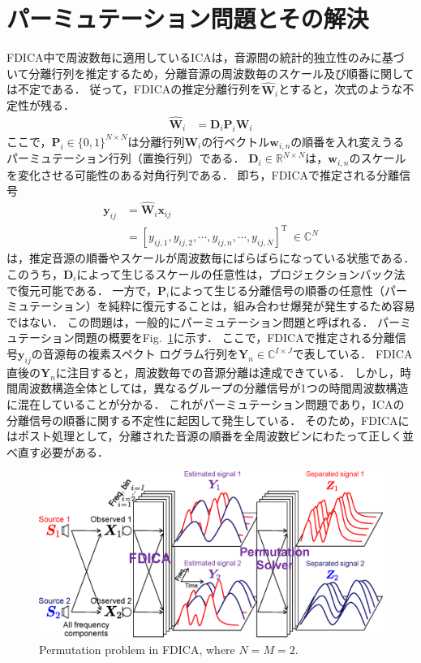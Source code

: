 \section{パーミュテーション問題とその解決}
\label{sec:pp}
FDICA中で周波数毎に適用しているICAは，音源間の統計的独立性のみに基づいて分離行列を推定するため，分離音源の周波数毎のスケール及び順番に関しては不定である．
従って，FDICAの推定分離行列を$\hat{\bm{W}}_i$とすると，次式のような不定性が残る．
\begin{align}
	\hat{\bm{W}}_{i} &= \bm{D}_{i}\bm{P}_{i}  \bm{W}_{i}
\end{align}
ここで，$\bm{P}_i \in \{0, 1\}^{N \times N}$は分離行列$\bm{W}_{i}$の行ベクトル$\bm{w}_{i, n}$の順番を入れ変えうるパーミュテーション行列（置換行列）である．
$\bm{D}_i \in \mathbb{R}^{N \times N}$は，$\bm{w}_{i,n}$のスケールを変化させる可能性のある対角行列である．
即ち，FDICAで推定される分離信号
\begin{align}
\bm{y}_{ij} &= \hat{\bm{W}}_i\bm{x}_{ij} \\
&=\left[ y_{ij,1},y_{ij,2}, \cdots, y_{ij,n}, \cdots, y_{ij,N} \right]^\mathrm{T}~\in \mathbb{C}^{N} \label{eq:sepSig}
\end{align}
は，推定音源の順番やスケールが周波数毎にばらばらになっている状態である．
このうち，$\bm{D}_i$によって生じるスケールの任意性は，プロジェクションバック法\cite{Matsuoka2001_PB}で復元可能である．
一方で，$\bm{P}_i$によって生じる分離信号の順番の任意性（パーミュテーション）を純粋に復元することは，組み合わせ爆発が発生するため容易ではない．
この問題は，一般的にパーミュテーション問題と呼ばれる．
パーミュテーション問題の概要をFig.~\ref{fig:permu}に示す．
ここで，FDICAで推定される分離信号$\bm{y}_{ij}$の音源毎の複素スペクト
ログラム行列を$\bm{Y}_n \in \mathbb{C}^{I \times J}$で表している．
FDICA直後の$\bm{Y}_n$に注目すると，周波数毎での音源分離は達成できている．
しかし，時間周波数構造全体としては，異なるグループの分離信号が1つの時間周波数構造に混在していることが分かる．
これがパーミュテーション問題であり，ICAの分離信号の順番に関する不定性に起因して発生している．
そのため，FDICAにはポスト処理として，分離された音源の順番を全周波数ビンにわたって正しく並べ直す必要がある．
\begin{figure}[t]
    \begin{center}
        \includegraphics[width=0.95\columnwidth]{figures/permutation_image.eps}
    \end{center}
    \vspace{-8pt}
	\caption{Permutation problem in FDICA, where $N=M=2$.}
	\label{fig:permu}
\end{figure}

